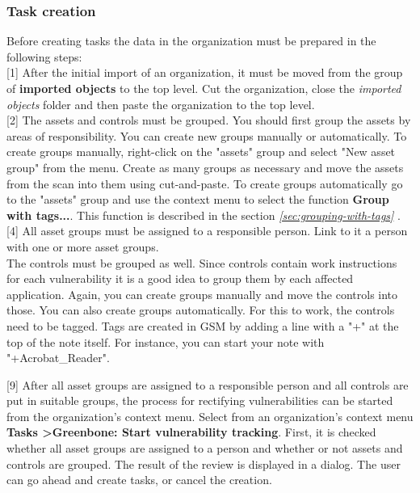 \documentclass[a4paper,10pt]{book}
\begin{document}
\subsubsection{Task creation}
Before creating tasks the data in the organization must be prepared in the following steps:
\newline\\
{[}1{]} After the initial import of an organization, it must be moved from the group of \textbf{imported objects} to the top level. Cut the organization, close the {\em imported objects} folder and then paste the organization to the top level.
\newline\\
{[}2{]} The assets and controls must be grouped.
You should first group the assets by areas of responsibility. You can create new groups manually or automatically. To create groups manually, right-click on the "assets" group and select "New asset group" from the menu. Create as many groups as necessary and move the assets from the scan into them using cut-and-paste.
To create groups automatically go to the "assets" group and use the context menu to select the function \textbf{Group with tags...}.
This function is described in the section {\em \ref{sec:grouping-with-tags} }.
\newline\\
{[}4{]} All asset groups must be assigned to a responsible person. Link to it a person with one or more asset groups.
\newline\\
The controls must be grouped as well. Since controls contain work instructions for each vulnerability it is a good idea to group them by each affected application. Again, you can create groups manually and move the controls into those. You can also create groups automatically. For this to work, the controls need to be tagged. Tags are created in GSM by adding a line with a "+" at the top of the note itself. For instance, you can start your note with "+Acrobat\_Reader".

{[}9{]} After all asset groups are assigned to a responsible person and all controls are put in suitable groups, the process for rectifying vulnerabilities can be started from the organization’s context menu. Select from an organization's context menu \textbf{Tasks \textgreater Greenbone: Start vulnerability tracking}. First, it is checked whether all asset groups are assigned to a person and whether or not assets and controls are grouped. The result of the review is displayed in a dialog. The user can go ahead and create tasks, or cancel the creation.
\end{document}
